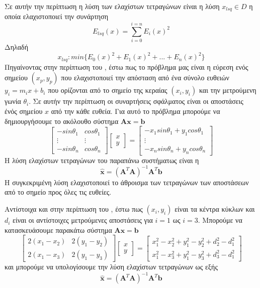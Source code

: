 Σε αυτήν την περίπτωση η λύση των ελαχίστων τετραγώνων είναι η λύση \(x_{lsq}\in D\) η οποία ελαχιστοποιεί την συνάρτηση
\[E_{lsq}(x) = \sum_{i=0}^{i=n}E_i(x)^2\]
Δηλαδή
\[x_{lsq} : min\{ E_0(x)^2 + E_1(x)^2 + ... + E_n(x)^2 \}\]
Πηγαίνοντας στην περίπτωση του , έστω πως το πρόβλημα μας είναι η εύρεση ενός σημείου \((x_p, y_p)\) που ελαχιστοποιεί την απόσταση
από ένα σύνολο ευθειών \(y_i = m_ix + b_i\) που ορίζονται από το σημείο της κεραίας \((x_i, y_i)\) και την μετρούμενη γωνία \(\theta_i\). Σε αυτήν την περίπτωση οι συναρτήσεις σφάλματος είναι οι αποστάσεις ένός σημείου \(x\) από την κάθε ευθεία. Για αυτό το πρόβλημα μπορούμε να δημιουργήσουμε το ακόλουθο σύστημα \(\mathbf{Ax = b}\) \cite{vandervorst}
\[
\begin{bmatrix}
-sin\theta_1 & cos\theta_1 \\
\vdots & \vdots \\
-sin\theta_n & cos\theta_n
\end{bmatrix}
\begin{bmatrix}
x \\ y
\end{bmatrix}
=
\begin{bmatrix}
-x_1sin\theta_1 + y_1cos\theta_1 \\
\vdots \\
-x_nsin\theta_n + y_ncos\theta_n
\end{bmatrix}
\]
Η λύση ελαχίστων τετραγώνων του παραπάνω συστήματως είναι η \cite{vandervorst}
\[\mathbf{\hat{x}} = (\mathbf{A}^T\mathbf{A})^{-1}\mathbf{A}^T\mathbf{b}\]
Η συγκεκριμένη λύση ελαχιστοποιεί το άθροισμα των τετραγώνων των αποστάσεων από το σημείο προς όλες τις ευθείες.

Αντίστοιχα και στην περίπτωση του , έστω πως \((x_i, y_i)\) είναι τα κέντρα κύκλων και \(d_i\) είναι οι αντίστοιχες μετρούμενες αποστάσεις για \(i = 1\) ως \(i = 3\). Μπορούμε να κατασκευάσουμε παρακάτω σύστημα \(\mathbf{Ax = b}\) \cite{junhuayang}
\[
\begin{bmatrix}
2(x_1 - x_2) & 2(y_1 - y_2) \\
2(x_1 - x_3) & 2(y_1 - y_3)
\end{bmatrix}
\begin{bmatrix}
x \\ y
\end{bmatrix}
=
\begin{bmatrix}
x_1^2 - x_2^2 + y_1^2 - y_2^2 + d_2^2 - d_1^2 \\
x_1^2 - x_3^2 + y_1^2 - y_3^2 + d_3^2 - d_1^2
\end{bmatrix}
\]
και μπορούμε να υπολογίσουμε την λύση ελαχίστων τετραγώνων ως εξής
\[\mathbf{\hat{x}} = (\mathbf{A}^T\mathbf{A})^{-1}\mathbf{A}^T\mathbf{b}\]

